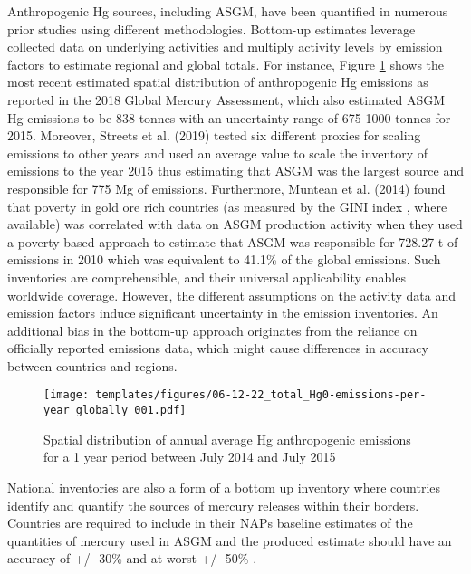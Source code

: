 \begin{flushleft}
Anthropogenic Hg sources, including ASGM, have been quantified in numerous prior studies using different methodologies. Bottom-up estimates leverage collected data on underlying activities and multiply activity levels by emission factors to estimate regional and global totals. For instance, Figure \ref{fig:World_Hg_em} shows the most recent estimated spatial distribution of anthropogenic Hg emissions as reported in the 2018 Global Mercury Assessment, which also estimated ASGM Hg emissions to be 838 tonnes with an uncertainty range of 675-1000 tonnes for 2015\cite{united_nations_environment_programme_technical_2019}. Moreover, Streets et al. (2019) tested six different proxies for scaling emissions to other years and used an average value to scale the inventory of emissions to the year 2015 thus estimating that ASGM was the largest source and responsible for 775 Mg of emissions\cite{streets_global_2019}. Furthermore, Muntean et al. (2014) found that poverty in  gold ore rich countries (as measured by the GINI index \cite{sadefo_kamdem_nice_2012}, where available) was correlated with data on ASGM production activity when they used a poverty-based approach to estimate that ASGM was responsible for 728.27 t of emissions in 2010 which was equivalent to 41.1\% of the global emissions\cite{muntean_evaluating_2018}. Such inventories are comprehensible, and their universal applicability enables worldwide coverage. However, the different assumptions on the activity data and emission factors induce significant uncertainty in the emission inventories. An additional bias in the bottom-up approach originates from the reliance on officially reported emissions data, which might cause differences in accuracy between countries and regions.
\begin{figure}[H]
  \texttt{[image: templates/figures/06-12-22\_total\_Hg0-emissions-per-year\_globally\_001.pdf]}
  \centering
  \caption{Spatial distribution of annual average Hg anthropogenic emissions for a 1 year period between July 2014 and July 2015}
  \label{fig:World_Hg_em}
\end{figure}
\FloatBarrier

National inventories are also a form of a bottom up inventory where countries identify and quantify the sources of mercury releases within their borders. Countries are required to include in their NAPs baseline estimates of the quantities of mercury used in ASGM and the produced estimate should have an accuracy of +/- 30\% and at worst +/- 50\% \cite{united_nations_environment_programme_estimating_2017}.
\end{flushleft}

